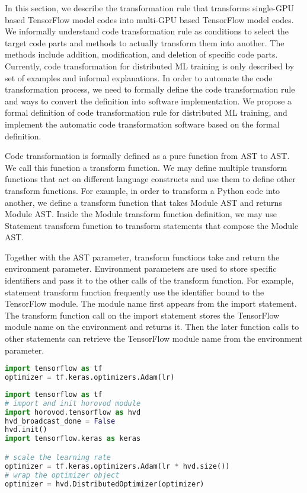 
In this section, we describe the transformation rule that
transforms single-GPU based TensorFlow model codes into
multi-GPU based TensorFlow model codes.
We informally understand code transformation rule as
conditions to select the target code parts
and methods to actually transform them into another.
The methods include addition, modification, and deletion of
specific code parts.
Currently, code transformation for distributed ML training
is only described by set of examples and informal explanations.
In order to automate the code transformation process,
we need to formally define the code transformation rule
and ways to convert the definition into software implementation.
We propose a formal definition of code transformation rule
for distributed ML training, and implement the automatic code transformation
software based on the formal definition.

Code transformation is formally defined as a pure function from AST to AST.
We call this function a transform function.
We may define multiple transform functions that act on different
language constructs and use them to define other transform functions.
For example, in order to transform a Python code into another,
we define a transform function that takes Module AST and returns Module AST.
Inside the Module transform function definition,
we may use Statement transform function to transform statements
that compose the Module AST.

Together with the AST parameter, transform functions take and return
the environment parameter.
Environment parameters are used to store specific identifiers
and pass it to the other calls of the transform function.
For example, statement transform function frequently use 
the identifier bound to the TensorFlow module.
The module name first appears from the import statement.
The transform function call on the import statement stores
the TensorFlow module name on the environment and returns it.
Then the later function calls to other statements can
retrieve the TensorFlow module name from the environment parameter.


\begin{lstlisting}[language=Python, caption = Original code example]
import tensorflow as tf
optimizer = tf.keras.optimizers.Adam(lr)\end{lstlisting}

\begin{lstlisting}[language=Python, caption = Transformed code example]
import tensorflow as tf
# import and init horovod module
import horovod.tensorflow as hvd
hvd_broadcast_done = False
hvd.init()
import tensorflow.keras as keras

# scale the learning rate
optimizer = tf.keras.optimizers.Adam(lr * hvd.size())
# wrap the optimizer object
optimizer = hvd.DistributedOptimizer(optimizer)
\end{lstlisting}

